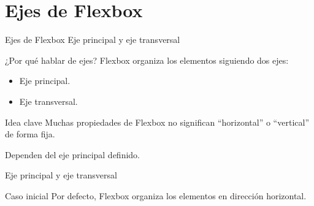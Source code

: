 \documentclass[aspectratio=169,11.5pt]{beamer}
\begin{document}

    \section{Ejes de Flexbox}

    \SectionSlide
    {Ejes de Flexbox}
    {Eje principal y eje transversal}

    \begin{frame}{¿Por qué hablar de ejes?}
        Flexbox organiza los elementos siguiendo dos ejes:

        \begin{itemize}
            \item Eje principal.
            \item Eje transversal.
        \end{itemize}

        \begin{block}{Idea clave}
            Muchas propiedades de Flexbox no significan
            ``horizontal'' o ``vertical'' de forma fija.

            Dependen del eje principal definido.
        \end{block}
    \end{frame}

    \begin{frame}{Eje principal y eje transversal}
        \begin{center}
        \end{center}

        \begin{block}{Caso inicial}
            Por defecto, Flexbox organiza los elementos
            en dirección horizontal.
        \end{block}
    \end{frame}
\end{document}
